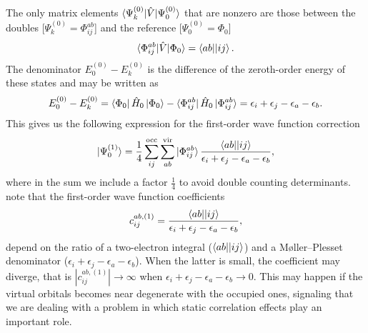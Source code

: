 \documentclass[../Main/chem532-notes.tex]{subfiles}
\begin{document}
The only matrix elements $\braket{\Psi_k^{(0)}|\hat{V}|\Psi_0^{(0)}}$ that are nonzero are those between the doubles [$\Psi_k^{(0)} = \Phi_{ij}^{ab}$] and the reference [$\Psi_0^{(0)} = \Phi_0$]
\begin{equation}
\braket{\Phi_{ij}^{ab}|\hat{V}|\Phi_0} = \bra{ab}\!\ket{ij}.
\end{equation}
The denominator $E_0^{(0)} - E_k^{(0)}$ is the difference of the zeroth-order energy of these states and may be written as
\begin{equation}
E_0^{(0)} - E_k^{(0)} = \bra{\Phi_0} \hat{H}_0 \ket{\Phi_0} - 
\bra{\Phi_{ij}^{ab}} \hat{H}_0 \ket{\Phi_{ij}^{ab}} = 
\epsilon_i + \epsilon_j - \epsilon_a - \epsilon_b.
\end{equation}
This gives us the following expression for the first-order wave function correction
\begin{equation}
\ket{\Psi_0^{(1)}} = \frac{1}{4} \sum_{ij}^{\mathrm{occ}} \sum_{ab}^{\mathrm{vir}}  \ket{\Phi_{ij}^{ab}} \frac{\bra{ab}\!\ket{ij}}{\epsilon_i + \epsilon_j - \epsilon_a - \epsilon_b},
\end{equation}
where in the sum we include a factor $\frac{1}{4}$ to avoid double counting determinants.
note that the first-order wave function coefficients
\begin{equation}
c_{ij}^{ab,(1)} =  \frac{\bra{ab}\!\ket{ij}}{\epsilon_i + \epsilon_j - \epsilon_a - \epsilon_b},
\end{equation}
depend on the ratio of a two-electron integral ($\bra{ab}\!\ket{ij}$) and a M{\o}ller--Plesset denominator ($\epsilon_i + \epsilon_j - \epsilon_a - \epsilon_b$). When the latter is small, the coefficient may diverge, that is $|c_{ij}^{ab,(1)}| \rightarrow \infty$ when $\epsilon_i + \epsilon_j - \epsilon_a - \epsilon_b \rightarrow 0.$
This may happen if the virtual orbitals becomes near degenerate with the occupied ones, signaling that we are dealing with a problem in which static correlation effects play an important role.
\end{document}
